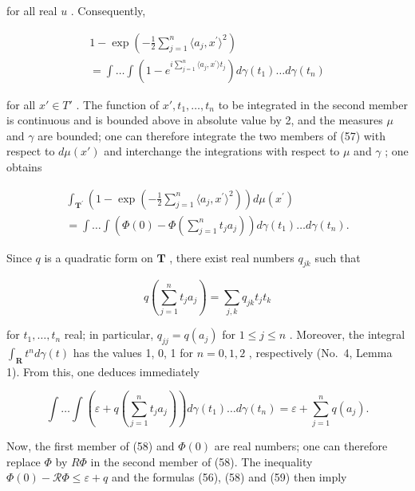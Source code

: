 for all real \(u\) . Consequently,

\[
\begin{array}{l} 1 - \exp \left(- \frac {1}{2} \sum_ {j = 1} ^ {n} \langle a _ {j}, x ^ {\prime} \rangle^ {2}\right) \\ = \int \dots \int \left(1 - e ^ {i \sum_ {j = 1} ^ {n} \langle a _ {j}, x ^ {\prime} \rangle t _ {j}}\right) d \gamma (t _ {1}) \dots d \gamma (t _ {n}) \end{array}\tag{57}
\]

for all \(x' \in T'\) . The function of \(x', t_{1}, \ldots, t_{n}\) to be integrated in the second member is continuous and is bounded above in absolute value by 2, and the measures \(\mu\) and \(\gamma\) are bounded; one can therefore integrate the two members of (57) with respect to \(d\mu(x')\) and interchange the integrations with respect to \(\mu\) and \(\gamma\) ; one obtains

\[
\begin{array}{l} \int_ {\mathbf {T} ^ {\prime}} \left(1 - \exp \left(- \frac {1}{2} \sum_ {j = 1} ^ {n} \langle a _ {j}, x ^ {\prime} \rangle^ {2}\right)\right) d \mu (x ^ {\prime}) \\ = \int \dots \int \left(\Phi (0) - \Phi \left(\sum_ {j = 1} ^ {n} t _ {j} a _ {j}\right)\right) d \gamma (t _ {1}) \dots d \gamma (t _ {n}). \end{array}\tag{58}
\]

Since \(q\) is a quadratic form on \(\mathbf{T}\) , there exist real numbers \(q_{jk}\) such that

\[
q \left(\sum_ {j = 1} ^ {n} t _ {j} a _ {j}\right) = \sum_ {j, k} q _ {j k} t _ {j} t _ {k}
\]

for \(t_1, \ldots, t_n\) real; in particular, \(q_{jj} = q(a_j)\) for \(1 \leqslant j \leqslant n\) . Moreover, the integral \(\int_{\mathbf{R}} t^n d\gamma(t)\) has the values 1, 0, 1 for \(n = 0, 1, 2\) , respectively (No.~4, Lemma 1). From this, one deduces immediately

\[
\int \dots \int \left(\varepsilon + q \left(\sum_ {j = 1} ^ {n} t _ {j} a _ {j}\right)\right) d \gamma (t _ {1}) \dots d \gamma (t _ {n}) = \varepsilon + \sum_ {j = 1} ^ {n} q (a _ {j}).\tag{59}
\]

Now, the first member of (58) and \(\Phi(0)\) are real numbers; one can therefore replace \(\Phi\) by \(R\Phi\) in the second member of (58). The inequality \(\Phi(0)-\mathcal{R}\Phi\leqslant\varepsilon+q\) and the formulas (56), (58) and (59) then imply

